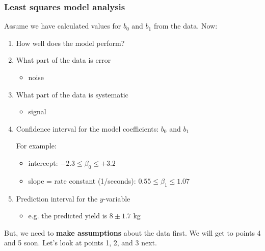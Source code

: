 \begin{frame}\frametitle{Least squares model \textcolor{myOrange}{analysis}}

	Assume we have calculated values for $b_0$ and $b_1$ from the data. Now:
	\begin{enumerate}
		\item	How well does the model perform?
		\item	What part of the data is error
		\begin{itemize}
			\item	noise
		\end{itemize}
		\item	What part of the data is systematic
		\begin{itemize}
			\item	signal
		\end{itemize}
		\item	Confidence interval for the model coefficients: $b_0$ and $b_1$
		
		\vspace{12pt}
		For example:
		\begin{itemize}
			\item	intercept: $-2.3 \leq \beta_0 \leq +3.2$
			\item	slope = rate constant (1/seconds): $0.55 \leq \beta_1 \leq 1.07$
		\end{itemize}
		\item	Prediction interval for the $y$-variable
		\begin{itemize}
			\item	e.g. the predicted yield is $8 \pm 1.7$ kg
		\end{itemize}
	\end{enumerate}

	\vspace{12pt}
	But, we need to \textbf{make assumptions} about the data first. We will get to points 4 and 5 soon. Let's look at points 1, 2, and 3 next.
\end{frame}

